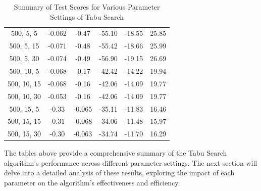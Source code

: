 \documentclass[
]{article}
\begin{document}
\begin{table}[H]
{\begin{tabular}{|c|c|c|c|c|c|}
                500, 5, 5                  & -0.062                     & -0.47                      & -55.10                     & -18.55                   & 25.85                   \\
                500, 5, 15                 & -0.071                     & -0.48                      & -55.42                     & -18.66                   & 25.99                   \\
                500, 5, 30                 & -0.074                     & -0.49                      & -56.90                     & -19.15                   & 26.69                   \\
                500, 10, 5                 & -0.068                     & -0.17                      & -42.42                     & -14.22                   & 19.94                   \\
                500, 10, 15                & -0.068                     & -0.16                      & -42.06                     & -14.09                   & 19.77                   \\
                500, 10, 30                & -0.053                     & -0.16                      & -42.06                     & -14.09                   & 19.77                   \\
                500, 15, 5                 & -0.33                      & -0.065                     & -35.11                     & -11.83                   & 16.46                   \\
                500, 15, 15                & -0.31                      & -0.068                     & -34.06                     & -11.48                   & 15.97                   \\
                500, 15, 30                & -0.30                      & -0.063                     & -34.74                     & -11.70                   & 16.29                   \\
                \hline
            \end{tabular}
        }
        \caption{Summary of Test Scores for Various Parameter Settings of Tabu Search}
        \label{tab:ts_summary_test_scores}
    \end{table}

    The tables above provide a comprehensive summary of the Tabu Search algorithm's performance across different parameter settings. The next section will delve into a detailed analysis of these results, exploring the impact of each parameter on the algorithm's effectiveness and efficiency.
\end{document}
